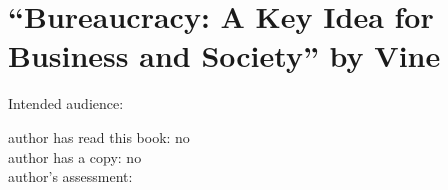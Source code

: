 \section{``Bureaucracy: A Key Idea for Business and Society'' by Vine\label{review:vine_key}}

\cite{2020_Vine}

Intended audience:

author has read this book: no\\
author has a copy: no\\
author's assessment:
